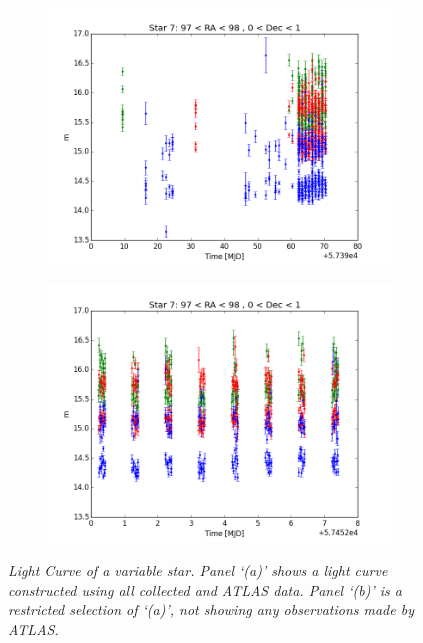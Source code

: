\documentclass[aps,prl,twocolumn,superscriptaddress]{revtex4-1}
\begin{document}
\begin{figure}
	\centering
	\begin{subfigure}{.5\textwidth}
	  \centering
	  \includegraphics[width=1\linewidth]{figures/LC/star7_97_98_0_1.png}
		\caption{\it \small{ }}
		\label{fig:LC7}
	\end{subfigure}%
	\begin{subfigure}{.5\textwidth}
	  \centering
			\includegraphics[width=1\linewidth]{figures/LC/star7_97_98_0_1_restricted.png}
		\caption{\it \small{ }}
		\label{fig:restrictedLC7}
	\end{subfigure}
	\caption{\it \small{Light Curve of a variable star.  Panel `(a)' shows a light curve constructed using all collected and ATLAS data.  Panel `(b)' is a restricted selection of `(a)', not showing any observations made by ATLAS.}}
	\label{fig:LC}
\end{figure}
\end{document}

